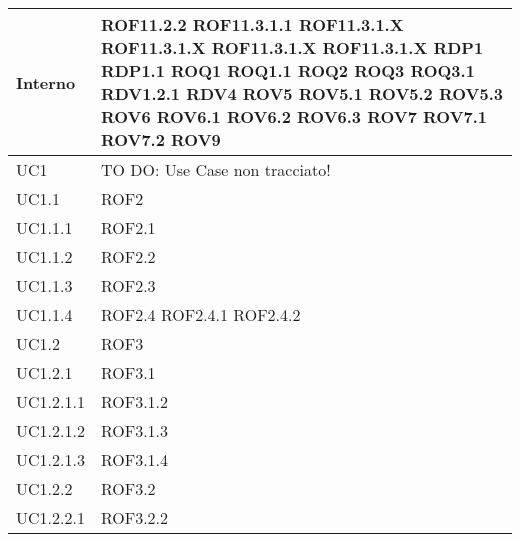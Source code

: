\begin{center}
\begin{longtable}{| p{4cm} | p{4cm} |}
\hline
Interno & ROF11.2.2 \newline ROF11.3.1.1 \newline ROF11.3.1.X \newline ROF11.3.1.X \newline ROF11.3.1.X \newline ROF11.3.1.X \newline RDP1 \newline RDP1.1 \newline ROQ1 \newline ROQ1.1 \newline ROQ2 \newline ROQ3 \newline ROQ3.1 \newline RDV1.2.1 \newline RDV4 \newline ROV5 \newline ROV5.1 \newline ROV5.2 \newline ROV5.3 \newline ROV6 \newline ROV6.1 \newline ROV6.2 \newline ROV6.3 \newline ROV7 \newline ROV7.1 \newline ROV7.2 \newline ROV9 \newline \\
\hline
UC1 & TO DO: Use Case non tracciato! \\
\hline
UC1.1 & ROF2 \\
\hline
UC1.1.1 & ROF2.1 \\
\hline
UC1.1.2 & ROF2.2 \\
\hline
UC1.1.3 & ROF2.3 \\
\hline
UC1.1.4 & ROF2.4 \newline ROF2.4.1 \newline ROF2.4.2 \\
\hline
UC1.2 & ROF3 \\
\hline
UC1.2.1 & ROF3.1 \\
\hline
UC1.2.1.1 & ROF3.1.2 \\
\hline
UC1.2.1.2 & ROF3.1.3 \\
\hline
UC1.2.1.3 & ROF3.1.4 \\
\hline
UC1.2.2 & ROF3.2 \\
\hline
UC1.2.2.1 & ROF3.2.2 \\
\hline

\end{longtable}
\end{center}
